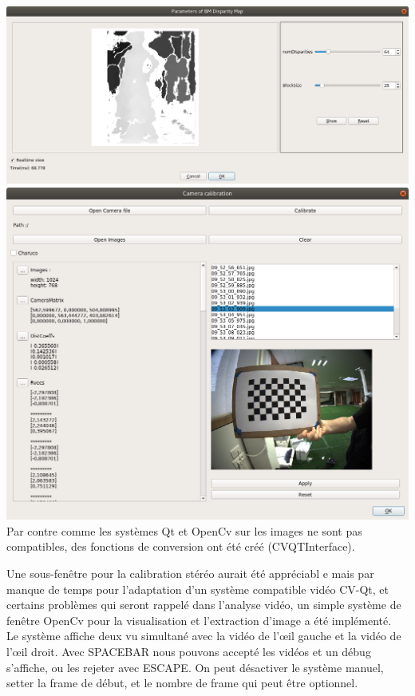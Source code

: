 \documentclass{article}
\begin{document}
\includegraphics[width=\linewidth]{img/sgbm.png}\\

\includegraphics[width=\linewidth]{img/calib.png}\\

Par contre comme les systèmes Qt et OpenCv sur les images ne sont pas compatibles, des fonctions de conversion ont été créé (CVQTInterface).

Une sous-fenêtre pour la calibration stéréo aurait été appréciabl e mais par manque de temps pour l'adaptation d'un système compatible vidéo CV-Qt, et certains problèmes qui seront rappelé dans l'analyse vidéo, un simple système de fenêtre OpenCv pour la visualisation et l'extraction d'image a été implémenté.\\
Le système affiche deux vu simultané avec la vidéo de l’œil gauche et la vidéo de l’œil droit. Avec SPACEBAR nous pouvons accepté les vidéos et un débug s'affiche, ou les rejeter avec ESCAPE.
On peut désactiver le système manuel, setter la frame de début, et le nombre de frame qui peut être optionnel.\\
\end{document}
